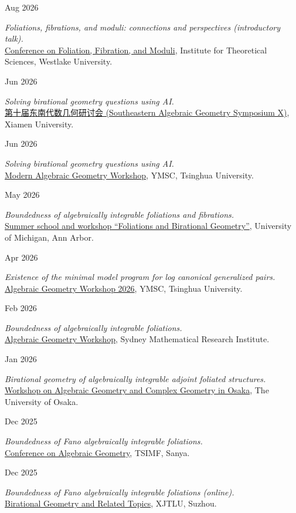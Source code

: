 \documentclass[11pt]{article}
\newlength{\datewidth}
\newcommand{\entry}[2]{%
  \noindent
  \begin{minipage}[t]{\datewidth}
    \raggedright\small\color{muted}#1
  \end{minipage}%
  \hfill%
  \begin{minipage}[t]{\dimexpr\linewidth-\datewidth-0.1in\relax}
    \raggedright #2
  \end{minipage}\par\vspace{4pt}
}
\begin{document}
\entry{Aug 2026}{\emph{Foliations, fibrations, and moduli: connections and perspectives (introductory talk).}\\ \href{https://jihaoliu.org/ffm-conference.html}{Conference on Foliation, Fibration, and Moduli}, Institute for Theoretical Sciences, Westlake University.}

\entry{Jun 2026}{\emph{Solving birational geometry questions using AI.}\\ \href{https://tianyuan.xmu.edu.cn/cn/Workshop/4115.html}{{\cnfont 第十届东南代数几何研讨会} (Southeastern Algebraic Geometry Symposium X)}, Xiamen University.}

\entry{Jun 2026}{\emph{Solving birational geometry questions using AI.}\\ \href{https://ymsc.tsinghua.edu.cn/en/info/1385/3982.htm}{Modern Algebraic Geometry Workshop}, YMSC, Tsinghua University.}

\entry{May 2026}{\emph{Boundedness of algebraically integrable foliations and fibrations.}\\ \href{https://simonsmoduli.com/events/ann-arbor/}{Summer school and workshop “Foliations and Birational Geometry”}, University of Michigan, Ann Arbor.}

\entry{Apr 2026}{\emph{Existence of the minimal model program for log canonical generalized pairs.}\\ \href{http://ymsc.tsinghua.edu.cn/en/info/1060/3751.htm}{Algebraic Geometry Workshop 2026}, YMSC, Tsinghua University.}

\entry{Feb 2026}{\emph{Boundedness of algebraically integrable foliations.}\\ \href{https://sites.google.com/view/ag-workshop-sydney-2026/schedule}{Algebraic Geometry Workshop}, Sydney Mathematical Research Institute.}

\entry{Jan 2026}{\emph{Birational geometry of algebraically integrable adjoint foliated structures.}\\ \href{https://masataka123.github.io/AGCG_Osaka_2026/}{Workshop on Algebraic Geometry and Complex Geometry in Osaka}, The University of Osaka.}

\entry{Dec 2025}{\emph{Boundedness of Fano algebraically integrable foliations.}\\ \href{https://tsimf.tsinghua.edu.cn/info/1477/1636.htm}{Conference on Algebraic Geometry}, TSIMF, Sanya.}

\entry{Dec 2025}{\emph{Boundedness of Fano algebraically integrable foliations (online).}\\ \href{https://jihaoliu.org/assets/posters/xjtlu-2025-bgrt.pdf}{Birational Geometry and Related Topics}, XJTLU, Suzhou.}
\end{document}
